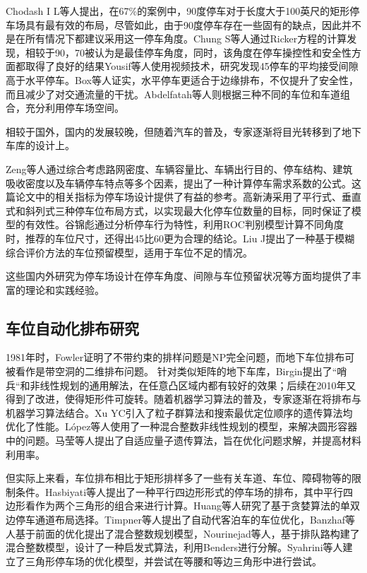 Chodash I L\cite{chodash1986relative}等人提出，在67\%的案例中，90度停车对于长度大于100英尺的矩形停车场具有最有效的布局，尽管如此，由于90度停车存在一些固有的缺点，因此并不是在所有情况下都建议采用这一停车角度。Chung S\cite{chen1988optimum}等人通过Ricker方程的计算发现，相较于90\textdegree，70\textdegree 被认为是最佳停车角度，同时，该角度在停车操控性和安全性方面都取得了良好的结果Yousif\cite{yousif2000comparison}等人使用视频技术，研究发现45\textdegree 停车的平均接受间隙高于水平停车。Box\cite{box2002angle}等人证实，水平停车更适合于边缘排布，不仅提升了安全性，而且减少了对交通流量的干扰。Abdelfatah\cite{abdelfatah2014parking}等人则根据三种不同的车位和车道组合，充分利用停车场空间。

相较于国外，国内的发展较晚，但随着汽车的普及，专家逐渐将目光转移到了地下车库的设计上。

Zeng\cite{zeng2009research}等人通过综合考虑路网密度、车辆容量比、车辆出行目的、停车结构、建筑吸收密度以及车辆停车特点等多个因素，提出了一种计算停车需求系数的公式。这篇论文中的相关指标为停车场设计提供了有益的参考。高新涛\cite{HNKJ201518025}采用了平行式、垂直式和斜列式三种停车位布局方式，以实现最大化停车位数量的目标，同时保证了模型的有效性。谷锦彪\cite{1017056100.nh}通过分析停车行为特性，利用ROC判别模型计算不同角度时，推荐的车位尺寸，还得出45\textdegree 比60\textdegree 更为合理的结论。Liu J\cite{liu2021parking}提出了一种基于模糊综合评价方法的车位预留模型，适用于车位不足的情况。

这些国内外研究为停车场设计在停车角度、间隙与车位预留状况等方面均提供了丰富的理论和实践经验。
\subsection{车位自动化排布研究}
1981年时，Fowler\cite{fowler1981optimal}证明了不带约束的排样问题是NP完全问题，而地下车位排布可被看作是带空洞的二维排布问题。
针对类似矩阵的地下车库，Birgin\cite{birgin2006method, birgin2006orthogonal}提出了“哨兵“和非线性规划的通用解法，在任意凸区域内都有较好的效果；后续在2010年又得到了改进\cite{birgin2010orthogonal}，使得矩形件可旋转。随着机器学习算法的普及，专家逐渐在将排布与机器学习算法结合。Xu YC\cite{xu2007particle, xu2010genetic}引入了粒子群算法和搜索最优定位顺序的遗传算法均优化了性能。L{\'o}pez\cite{lopez2018packing}等人使用了一种混合整数非线性规划的模型，来解决圆形容器中的问题。马莹\cite{JSGG201820015}等人提出了自适应量子遗传算法，旨在优化问题求解，并提高材料利用率。

但实际上来看，车位排布相比于矩形排样多了一些有关车道、车位、障碍物等的限制条件。Hasbiyati\cite{hasbiyati2019parking}等人提出了一种平行四边形形式的停车场的排布，其中平行四边形看作为两个三角形的组合来进行计算。Huang\cite{huang2020general}等人研究了基于贪婪算法的单双边停车通道布局选择。Timpner\cite{timpner2015k}等人提出了自动代客泊车的车位优化，Banzhaf\cite{banzhaf2017high}等人基于前面的优化提出了混合整数规划模型，Nourinejad\cite{nourinejad2018designing}等人，基于排队路构建了混合整数模型，设计了一种启发式算法，利用Benders进行分解。Syahrini\cite{syahrini2018mathematical}等人建立了三角形停车场的优化模型，并尝试在等腰和等边三角形中进行尝试。


